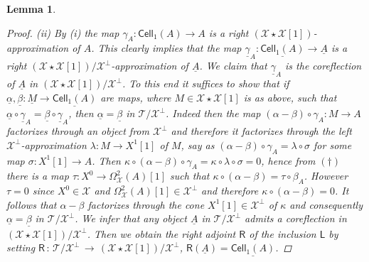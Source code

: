 \documentclass[oneside, a4paper,reqno]{amsart}
\numberwithin{equation}{section}
\newtheorem{lem}[thm]{Lemma}
\theoremstyle{definition}
\begin{document}
\begin{lem}
\begin{proof}
(ii) By (i)  the map $\gamma_{A} \colon \mathsf{Cell}_{1}(A) {\longrightarrow} A$ is a right $({\mathcal X}\star{\mathcal X}[1])$-approximation of $A$. This clearly implies that the map $\underline{\gamma}_{A} \colon  \underline{\mathsf{Cell}_{1}(A)} {\longrightarrow} \underline{A}$ is a right $({\mathcal X}\star{\mathcal X}[1])/{\mathcal X}^{\bot}$-approximation of ${\underline A}$. We claim that $\underline{\gamma}_{A}$ is the coreflection of ${\underline A}$ in $({\mathcal X}\star{\mathcal X}[1])/{\mathcal X}^{\bot}$. To this end it suffices to show that if $\underline{\alpha}, \underline{\beta} \colon \underline{M} {\longrightarrow} \underline{\mathsf{Cell}_{1}(A)}$ are maps, where $M \in {\mathcal X}\star {\mathcal X}[1]$ is as above,  such that $\underline{\alpha} \circ \underline{\gamma}_{A} =  \underline{\beta} \circ \underline{\gamma}_{A}$, then $\underline{\alpha} = \underline{\beta}$ in ${\mathcal T}/{\mathcal X}^{\bot}$. Indeed then the map $(\alpha - \beta)\circ \gamma_{A} \colon M {\longrightarrow} A$ factorizes through an object from ${\mathcal X}^{\bot}$ and therefore it factorizes through the left ${\mathcal X}^{\bot}$-approximation $\lambda \colon M {\longrightarrow} X^{1}[1]$ of $M$, say as $(\alpha - \beta)\circ \gamma_{A} = \lambda \circ \sigma$ for some map $\sigma \colon X^{1}[1] {\longrightarrow} A$. Then $\kappa \circ (\alpha - \beta)\circ \gamma_{A} = \kappa \circ \lambda \circ \sigma = 0$, hence from $(\dag)$ there is a map $\tau \colon X^{0} {\longrightarrow} \Omega^{2}_{\mathcal X}(A)[1]$ such that $\kappa \circ (\alpha - \beta) = \tau \circ \beta_{A}$. However $\tau = 0$ since $X^{0}\in {\mathcal X}$ and $\Omega^{2}_{\mathcal X}(A)[1] \in {\mathcal X}^{\bot}$ and therefore $\kappa \circ (\alpha - \beta) = 0$. It follows that $\alpha - \beta$ factorizes through the cone $X^{1}[1] \in {\mathcal X}^{\bot}$ of $\kappa$ and consequently $\underline{\alpha} = \underline{\beta}$ in ${\mathcal T}/{\mathcal X}^{\bot}$. We infer that any object ${\underline A}$ in ${\mathcal T}/{\mathcal X}^{\bot}$ admits a coreflection in $({\mathcal X}\star{\mathcal X}[1])/{\mathcal X}^{\bot}$. Then we obtain the right adjoint $\mathsf{R}$ of the inclusion $\mathsf{L}$ by  setting $\mathsf{R} \, \colon \, {\mathcal T}/{\mathcal X}^{\bot} \, {\longrightarrow} \,({\mathcal X}\star{\mathcal X}[1])/{\mathcal X}^{\bot}$, $\mathsf{R} ({\underline A}) = \underline{\mathsf{Cell}_{1}(A)}$. 
\end{proof}
\end{lem}

 
\end{document}
